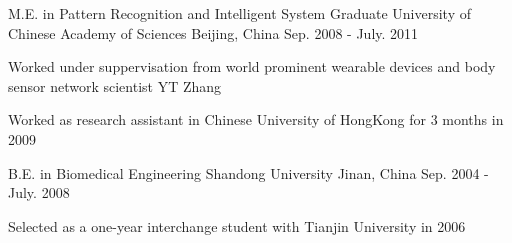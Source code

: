 

\begin{cventries}

  \cventry
   {M.E. in Pattern Recognition and Intelligent System}
   {Graduate University of Chinese Academy of Sciences}
   {Beijing, China}
   {Sep. 2008 - July. 2011}
   {
     \begin{cvitems}
       \item {Worked under suppervisation from world prominent wearable devices and body sensor network scientist YT Zhang}
       \item {Worked as research assistant in Chinese University of HongKong for 3 months in 2009}
     \end{cvitems}
   }
   
  \cventry
    {B.E. in Biomedical Engineering} %
    {Shandong University} %
    {Jinan, China} %
    {Sep. 2004 - July. 2008} %
    {
      \begin{cvitems} %
        \item {Selected as a one-year interchange student with Tianjin University in 2006}
      \end{cvitems}
    }

\end{cventries}
